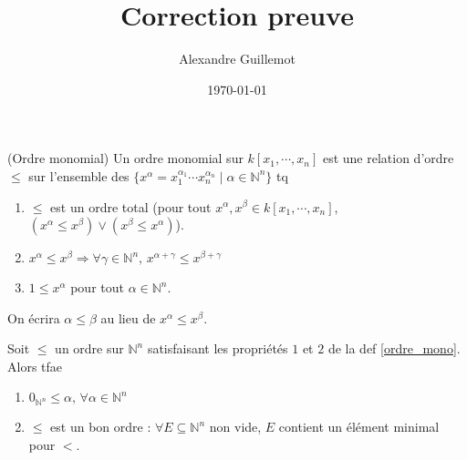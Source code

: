 \documentclass[11pt]{article}
\begin{document}
\title{Correction preuve}
\date{\today}
\author{Alexandre Guillemot}
\maketitle

\begin{defi} (Ordre monomial)
    \label{ordre_mono}
    Un ordre monomial sur $k[x_1, \cdots, x_n]$ est une relation d'ordre $\leq$ sur l'ensemble des $\{x^\alpha = x_1^{\alpha_1} \cdots x_n^{\alpha_n} \mid \alpha \in \mathbb{N}^n\}$ tq
    \begin{enumerate}
        \item $\leq$ est un ordre total (pour tout $x^\alpha, x^\beta \in k[x_1, \cdots, x_n]$, $(x^\alpha \leq x^\beta) \lor (x^\beta \leq x^\alpha)$).
        \item $x^\alpha \leq x^\beta \Rightarrow \forall \gamma \in \mathbb{N}^n,\, x^{\alpha + \gamma} \leq x^{\beta + \gamma}$
        \item $1 \leq x^\alpha$ pour tout $\alpha \in \mathbb{N}^n$.
    \end{enumerate}
\end{defi}
\begin{nota}
    On écrira $\alpha \leq \beta$ au lieu de $x^\alpha \leq x^\beta$.
\end{nota}
\begin{prop}
    Soit $\leq$ un ordre sur $\mathbb{N}^n$ satisfaisant les propriétés $1$ et $2$ de la def \ref{ordre_mono}. Alors tfae
    \begin{enumerate}\addtocounter{enumi}{2}
        \item $0_{\mathbb{N}^n} \leq \alpha ,\, \forall \alpha \in \mathbb{N}^n$
        \item $\leq$ est un bon ordre : $\forall E \subseteq \mathbb{N}^n$ non vide, $E$ contient un élément minimal pour $<$.
    \end{enumerate}
\end{prop}
\end{document}
